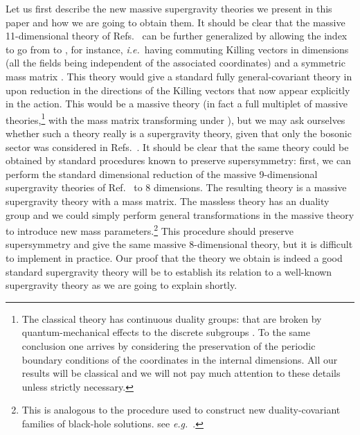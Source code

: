 \documentclass[12pt,a4paper]{article}
\begin{document}
Let us first describe the new massive supergravity theories we present
in this paper and how we are going to obtain them. It should be clear
that the massive 11-dimensional theory of Refs.~\cite{kn:BLO,kn:MO}
can be further generalized by allowing the index \coordHE{} to go from \coordHE{} to
\coordHE{}, for instance, {\em i.e.}~having \coordHE{} commuting Killing vectors in
\coordHE{} dimensions (all the fields being independent of the \coordHE{}
associated coordinates) and a \coordHE{} symmetric mass matrix
\coordHE{}.  This theory would give a standard fully general-covariant
theory in \coordHE{} upon reduction in the directions of the \coordHE{} Killing
vectors that now appear explicitly in the action. This would be a
massive theory (in fact a full \coordHE{} multiplet of massive
theories,\footnote{The classical theory has continuous duality groups:
  \coordHE{} that are broken by
  quantum-mechanical effects to the discrete subgroups
  \coordHE{}. To the same conclusion
  one arrives by considering the preservation of the periodic boundary
  conditions of the coordinates in the internal dimensions. All our
  results will be classical and we will not pay much attention to
  these details unless strictly necessary.} with the mass matrix
\coordHE{} transforming under \coordHE{}), but we may ask
ourselves whether such a theory really is a supergravity theory, given
that only the bosonic sector was considered in
Refs.~\cite{kn:BLO,kn:MO}. It should be clear that the same theory
could be obtained by standard procedures known to preserve
supersymmetry: first, we can perform the standard dimensional
reduction of the massive 9-dimensional supergravity theories of
Ref.~\cite{kn:MO} to 8 dimensions. The resulting theory is a massive
supergravity theory with a \coordHE{} mass matrix. The massless
theory has an \coordHE{} duality group
and we could simply perform general \coordHE{} transformations
in the massive theory to introduce new mass parameters.\footnote{This
  is analogous to the procedure used to construct new
  duality-covariant families of black-hole solutions. see {\em
    e.g.}~\cite{kn:KO}.} This procedure should preserve supersymmetry
and give the same massive 8-dimensional theory, but it is difficult to
implement in practice. Our proof that the theory we obtain is indeed a
good standard supergravity theory will be to establish its relation to
a well-known supergravity theory as we are going to explain shortly.
\end{document}
